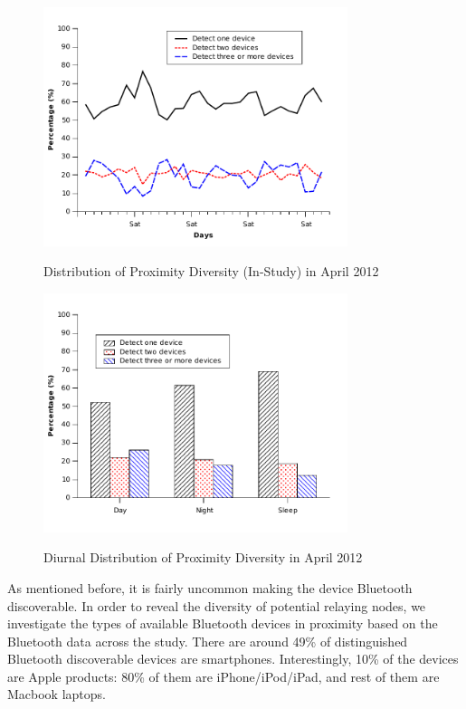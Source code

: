 \begin{figure}[tbp]
\centering 
{\includegraphics[width=3.5in]{graphs/relay_num.pdf}}
\caption{Distribution of Proximity Diversity (In-Study) in April 2012} 
\label{fig:relay_num}
\end{figure} 

\begin{figure}[tbp]
\centering 
{\includegraphics[width=3.5in]{graphs/relay_num_diurnal.pdf}}
\caption{Diurnal Distribution of Proximity Diversity in April 2012} 
\label{fig:relay_num_diurnal}
\end{figure} 

As mentioned before, it is fairly uncommon making the device Bluetooth discoverable. In order to reveal the diversity of potential relaying nodes, we investigate the types of available Bluetooth devices in proximity based on the Bluetooth data across the study. There are around 49\% of distinguished Bluetooth discoverable devices are smartphones. Interestingly, 10\% of the devices are Apple products: 80\% of them are iPhone/iPod/iPad, and rest of them are Macbook laptops. 

